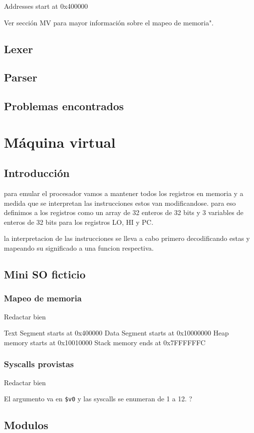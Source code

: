 \documentclass[12pt]{article}
\begin{document}
    Addresses start at 0x400000

Ver sección MV para mayor información sobre el mapeo de memoria".

\subsection{Lexer}
\subsection{Parser}
\subsection{Problemas encontrados}
    
   
\section{Máquina virtual}
\subsection{Introducción}
para emular el procesador vamos a mantener todos los registros en memoria y a
medida que se interpretan las instrucciones estos van modificandose.
para eso definimos a los registros como un array de 32 enteros de 32 bits
y 3 variables de enteros de 32 bits para  los registros LO, HI y PC.

la interpretacion de las instrucciones se lleva a cabo primero decodificando
estas y mapeando su significado a una funcion respectiva.
\subsection{Mini SO ficticio}
\subsubsection{Mapeo de memoria}
Redactar bien

Text Segment starts at 0x400000
Data Segment starts at 0x10000000
Heap memory starts at 0x10010000
Stack memory ends at 0x7FFFFFFC
\subsubsection{Syscalls provistas}
Redactar bien

El argumento va en \texttt{\$v0} y las syscalls se enumeran de 1 a 12. ?

\subsection{Modulos}
\end{document}
